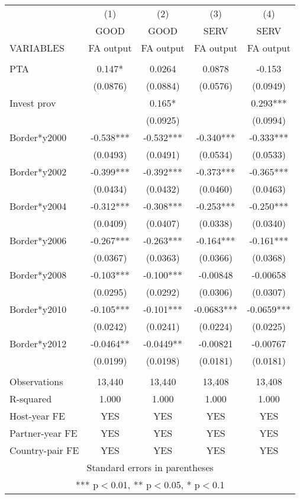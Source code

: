 \begin{tabular}{lcccc} \hline
 & (1) & (2) & (3) & (4) \\
 & GOOD & GOOD & SERV & SERV \\
VARIABLES & FA output & FA output & FA output & FA output \\ \hline
 &  &  &  &  \\
PTA & 0.147* & 0.0264 & 0.0878 & -0.153 \\
 & (0.0876) & (0.0884) & (0.0576) & (0.0949) \\
Invest prov &  & 0.165* &  & 0.293*** \\
 &  & (0.0925) &  & (0.0994) \\
Border*y2000 & -0.538*** & -0.532*** & -0.340*** & -0.333*** \\
 & (0.0493) & (0.0491) & (0.0534) & (0.0533) \\
Border*y2002 & -0.399*** & -0.392*** & -0.373*** & -0.365*** \\
 & (0.0434) & (0.0432) & (0.0460) & (0.0463) \\
Border*y2004 & -0.312*** & -0.308*** & -0.253*** & -0.250*** \\
 & (0.0409) & (0.0407) & (0.0338) & (0.0340) \\
Border*y2006 & -0.267*** & -0.263*** & -0.164*** & -0.161*** \\
 & (0.0367) & (0.0363) & (0.0366) & (0.0368) \\
Border*y2008 & -0.103*** & -0.100*** & -0.00848 & -0.00658 \\
 & (0.0295) & (0.0292) & (0.0306) & (0.0307) \\
Border*y2010 & -0.105*** & -0.101*** & -0.0683*** & -0.0659*** \\
 & (0.0242) & (0.0241) & (0.0224) & (0.0225) \\
Border*y2012 & -0.0464** & -0.0449** & -0.00821 & -0.00767 \\
 & (0.0199) & (0.0198) & (0.0181) & (0.0181) \\
 &  &  &  &  \\
Observations & 13,440 & 13,440 & 13,408 & 13,408 \\
R-squared & 1.000 & 1.000 & 1.000 & 1.000 \\
Host-year FE & YES & YES & YES & YES \\
Partner-year FE & YES & YES & YES & YES \\
 Country-pair FE & YES & YES & YES & YES \\ \hline
\multicolumn{5}{c}{ Standard errors in parentheses} \\
\multicolumn{5}{c}{ *** p$<$0.01, ** p$<$0.05, * p$<$0.1} \\
\end{tabular}
